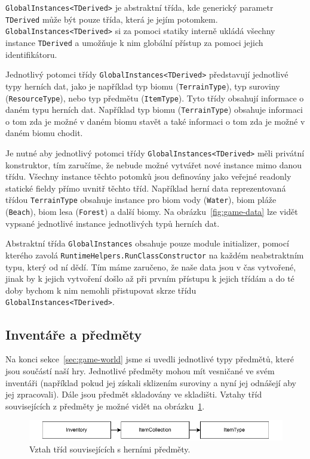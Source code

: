 \texttt{GlobalInstances<TDerived>} je abstraktní třída, kde generický parametr \texttt{TDerived} může být pouze třída, která je jejím potomkem. \texttt{GlobalInstances<TDerived>} si za pomoci statiky interně ukládá všechny instance \texttt{TDerived} a umožňuje k nim globální přístup za pomoci jejich identifikátoru.

Jednotlivý potomci třídy \texttt{GlobalInstances<TDerived>} představují jednotlivé typy herních dat, jako je například typ biomu (\texttt{TerrainType}), typ suroviny (\texttt{ResourceType}), nebo typ předmětu (\texttt{ItemType}). Tyto třídy obsahují informace o daném typu herních dat. Například typ biomu (\texttt{TerrainType}) obsahuje informaci o tom zda je možné v daném biomu stavět a také informaci o tom zda je možné v daném biomu chodit.

Je nutné aby jednotlivý potomci třídy \texttt{GlobalInstances<TDerived>} měli privátní konstruktor, tím zaručíme, že nebude možné vytvářet nové instance mimo danou třídu. Všechny instance těchto potomků jsou definovány jako veřejné readonly statické fieldy přímo uvnitř těchto tříd.  Například herní data reprezentovaná třídou \texttt{TerrainType} obsahuje instance pro biom vody (\texttt{Water}), biom pláže (\texttt{Beach}), biom lesa (\texttt{Forest}) a další biomy. Na obrázku~\ref{fig:game-data} lze vidět vypsané jednotlivé instance jednotlivých typů herních dat.

Abstraktní třída \texttt{GlobalInstances} obsahuje pouze module initializer, pomocí kterého zavolá \texttt{RuntimeHelpers.RunClassConstructor} na každém neabstraktním typu, který od ní dědí. Tím máme zaručeno, že naše data jsou v čas vytvořené, jinak by k jejich vytvoření došlo až při prvním přístupu k jejich třídám a do té doby bychom k nim nemohli přistupovat skrze třídu \texttt{GlobalInstances<TDerived>}.

\subsection{Inventáře a předměty}
Na konci sekce~\ref{sec:game-world} jsme si uvedli jednotlivé typy předmětů, které jsou součástí naší hry. Jednotlivé předměty mohou mít vesničané ve svém inventáři (například pokud jej získali sklizením suroviny a nyní jej odnášejí aby jej zpracovali). Dále jsou předmět skladovány ve skladišti. Vztahy tříd souvisejících z předměty je možné vidět na obrázku~\ref{fig:items}.

\begin{figure}[!htb]
  \centering
  \includegraphics[width=0.8\linewidth]{img/items.pdf}
  \caption{Vztah tříd souvisejících s herními předměty.}
  \label{fig:items}
\end{figure}

